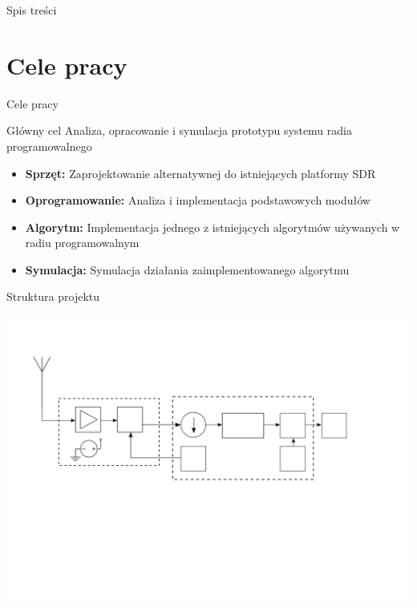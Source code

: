 \begin{frame}
	\titlepage
\end{frame}

\begin{frame}{Spis treści}
	\tableofcontents
\end{frame}

\section{Cele pracy}
\begin{frame}{Cele pracy}

	\begin{exampleblock}{Główny cel}
		Analiza, opracowanie i symulacja prototypu systemu radia programowalnego
	\end{exampleblock}

	\begin{itemize}
		\item \textbf{Sprzęt:} Zaprojektowanie alternatywnej do istniejących platformy SDR
		\item \textbf{Oprogramowanie:} Analiza i implementacja podstawowych modułów
		\item \textbf{Algorytm:} Implementacja jednego z istniejących algorytmów używanych w radiu programowalnym
		\item \textbf{Symulacja:} Symulacja działania zaimplementowanego algorytmu
	\end{itemize} 
\end{frame}

\begin{frame}{Struktura projektu}
	\begin{center}
		\scalebox{0.50}
		{\includegraphics{images/allModules}}
	\end{center}
\end{frame}

